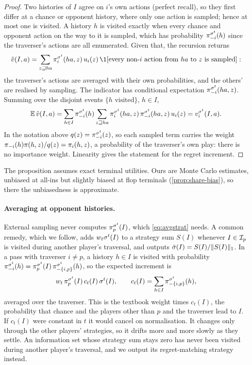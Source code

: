 \begin{proof}
Two histories of $I$ agree on $i$'s own actions (perfect recall), so they first differ at a chance or opponent
history, where only one action is sampled; hence at most one is visited. A history $h$ is visited exactly when every
chance and opponent action on the way to it is sampled, which has probability $\pi^{\sigma^t}_{-i}(h)$ since the
traverser's actions are all enumerated. Given that, the recursion returns
\[
  \tilde\cfv(I,a) = \sum_{z \sqsupseteq ha} \reach^{\strat^t}_i(ha,z)\, u_i(z)\,
  \1[\text{every non-}i\text{ action from } ha \text{ to } z \text{ is sampled}]:
\]
the traverser's actions are averaged with their own probabilities, and the others' are realised by sampling. The
indicator has conditional expectation $\pi^{\sigma^t}_{-i}(ha,z)$. Summing over the disjoint events $\{h
\text{ visited}\}$, $h \in I$,
\[
  \mathbb{E}\,\tilde{v}(I,a) = \sum_{h\in I} \pi^{\sigma^t}_{-i}(h) \sum_{z \sqsupseteq ha}
  \pi^{\sigma^t}_i(ha,z)\,\pi^{\sigma^t}_{-i}(ha,z)\, u_i(z) = v_i^{\sigma^t}(I,a).
\]
In the notation above $q(z) = \pi^{\sigma^t}_{-i}(z)$, so each sampled term carries the weight
$\pi_{-i}(h)\pi(h,z)/q(z) = \pi_i(h,z)$, a probability of the traverser's own play: there is no importance
weight. Linearity gives the statement for the regret increment.
\end{proof}

The proposition assumes exact terminal utilities. Ours are Monte Carlo estimates, unbiased at all-ins but slightly
biased at flop terminals (\cref{prop:share-bias}), so there the unbiasedness is approximate.

\paragraph{Averaging at opponent histories.}
External sampling never computes $\pi^{\sigma^t}_p(I)$, which \eqref{eq:avgstrat} needs. A common remedy, which we
follow, adds $w_t\sigma^t(I)$ to a strategy sum $S(I)$ whenever $I \in \mathcal{I}_p$ is visited during another player's
traversal, and outputs $\bar\sigma(I) = S(I)/\lVert S(I)\rVert_1$. In a pass with traverser $i \ne p$, a history $h \in
I$ is visited with probability $\pi^{\sigma^t}_{-i}(h) = \pi^{\sigma^t}_p(I)\,\pi^{\sigma^t}_{-\{i,p\}}(h)$,
so the expected increment is
\[
  w_t\, \pi^{\sigma^t}_p(I)\, c_t(I)\, \sigma^t(I), \qquad c_t(I) = \sum_{h\in I}\pi^{\sigma^t}_{-\{i,p\}}(h),
\]
averaged over the traverser. This is the textbook weight times $c_t(I)$, the probability that chance and the players
other than $p$ and the traverser lead to $I$. If $c_t(I)$ were constant in $t$ it would cancel on normalisation. It
changes only through the other players' strategies, so it drifts more and more slowly as they settle. An information
set whose strategy sum stays zero has never been visited during another player's traversal, and we output its
regret-matching strategy instead.

